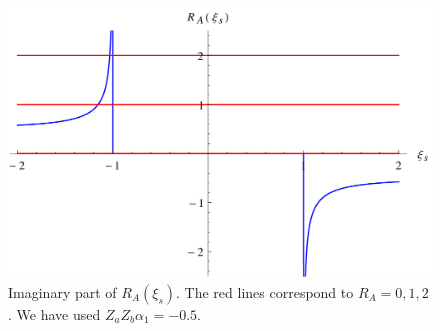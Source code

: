 \begin{figure}
\centering
\includegraphics[scale=0.6]{Plots/ImRA.pdf}
\caption[Imaginary part of the Regge trajectory function for the massless vector exchange model]{Imaginary part of $R_{A}(\xi_{s})$. The red lines correspond to $R_{A} = 0, 1, 2$. We have used $Z_{a} Z_{b} \alpha_{1} = -0.5$.}
\label{ImRAFig}
\end{figure}